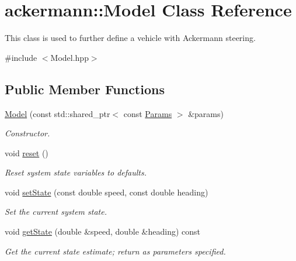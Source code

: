\hypertarget{classackermann_1_1_model}{}\section{ackermann\+:\+:Model Class Reference}
\label{classackermann_1_1_model}


This class is used to further define a vehicle with Ackermann steering.  




{\ttfamily \#include $<$Model.\+hpp$>$}

\subsection*{Public Member Functions}
\begin{DoxyCompactItemize}
\item 
\hyperlink{classackermann_1_1_model_ad9fa277e47f993c8089a9c388880a32c}{Model} (const std\+::shared\+\_\+ptr$<$ const \hyperlink{structackermann_1_1_params}{Params} $>$ \&params)
\begin{DoxyCompactList}\small\item\em Constructor. \end{DoxyCompactList}\item 
\mbox{\label{classackermann_1_1_model_a6dc1b7ae5c40f0950b4944a63b192550}} 
void \hyperlink{classackermann_1_1_model_a6dc1b7ae5c40f0950b4944a63b192550}{reset} ()
\begin{DoxyCompactList}\small\item\em Reset system state variables to defaults. \end{DoxyCompactList}\item 
void \hyperlink{classackermann_1_1_model_a109accf55eac34a33c9a5b2b8107e670}{set\+State} (const double speed, const double heading)
\begin{DoxyCompactList}\small\item\em Set the current system state. \end{DoxyCompactList}\item 
void \hyperlink{classackermann_1_1_model_a770662c33060369f437a098c944ca262}{get\+State} (double \&speed, double \&heading) const
\begin{DoxyCompactList}\small\item\em Get the current state estimate; return as parameters specified. \end{DoxyCompactList}\item 

\end{DoxyCompactItemize}
